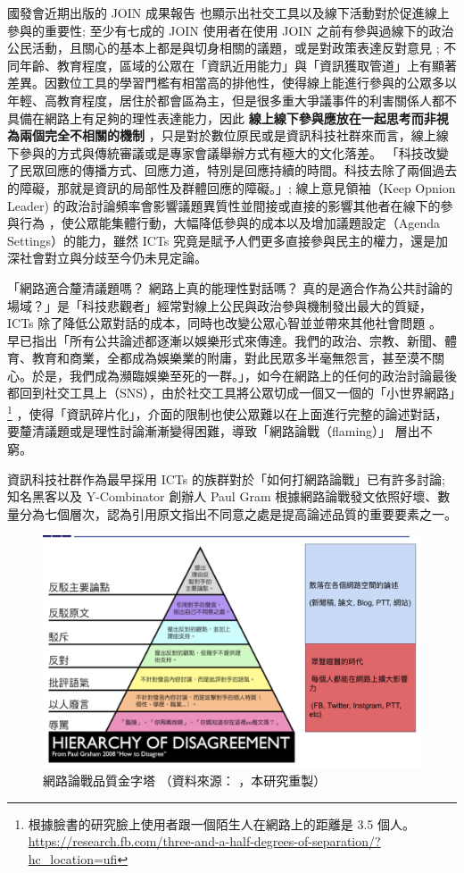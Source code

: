 \documentclass[12pt,a4paper]{article}
\begin{document}
國發會近期出版的 JOIN 成果報告 \citep*{chuang18,lin18a} 也顯示出社交工具以及線下活動對於促進線上參與的重要性; 至少有七成的 JOIN 使用者在使用 JOIN 之前有參與過線下的政治公民活動，且關心的基本上都是與切身相關的議題，或是對政策表達反對意見 ; 不同年齡、教育程度，區域的公眾在「資訊近用能力」與「資訊獲取管道」上有顯著差異。因數位工具的學習門檻有相當高的排他性，使得線上能進行參與的公眾多以年輕、高教育程度，居住於都會區為主，但是很多重大爭議事件的利害關係人都不具備在網路上有足夠的理性表達能力，因此 \textbf{線上線下參與應放在一起思考而非視為兩個完全不相關的機制} ，只是對於數位原民或是資訊科技社群來而言，線上線下參與的方式與傳統審議或是專家會議舉辦方式有極大的文化落差。
 「科技改變了民眾回應的傳播方式、回應力道，特別是回應持續的時間。科技去除了兩個過去的障礙，那就是資訊的局部性及群體回應的障礙。」\citep*[p.141]{xue11_xiang}; 線上意見領袖（Keep Opnion Leader) 的政治討論頻率會影響議題異質性並間接或直接的影響其他者在線下的參與行為 \citep*{lin18b} ，使公眾能集體行動，大幅降低參與的成本以及增加議題設定（Agenda Settings）的能力，雖然 ICTs 究竟是賦予人們更多直接參與民主的權力，還是加深社會對立與分歧至今仍未見定論。

「網路適合釐清議題嗎？ 網路上真的能理性對話嗎？ 真的是適合作為公共討論的場域？」是「科技悲觀者」經常對線上公民與政治參與機制發出最大的質疑，ICTs 除了降低公眾對話的成本，同時也改變公眾心智並並帶來其他社會問題 \citep*{stev11} 。 \citep*{neil16} 早已指出「所有公共論述都逐漸以娛樂形式來傳達。我們的政治、宗教、新聞、體育、教育和商業，全都成為娛樂業的附庸，對此民眾多半毫無怨言，甚至漠不關心。於是，我們成為瀕臨娛樂至死的一群。」，如今在網路上的任何的政治討論最後都回到社交工具上（SNS），由於社交工具將公眾切成一個又一個的「小世界網路」\footnote{根據臉書的研究臉上使用者跟一個陌生人在網路上的距離是 3.5 個人。 \url{https://research.fb.com/three-and-a-half-degrees-of-separation/?hc\_location=ufi}} ，使得「資訊碎片化」，介面的限制也使公眾難以在上面進行完整的論述對話，要釐清議題或是理性討論漸漸變得困難，導致「網路論戰（flaming）」\citep*{wiki:flaming} 層出不窮。

資訊科技社群作為最早採用 ICTs 的族群對於「如何打網路論戰」已有許多討論; 知名黑客以及 Y-Combinator 創辦人 Paul Gram 根據網路論戰發文依照好壞、數量分為七個層次，認為引用原文指出不同意之處是提高論述品質的重要要素之一。\citep*{paul08}

\begin{figure}[htbp]
\centering
\includegraphics[width=.9\linewidth]{./images/how-to-disagree.png}
\caption{\label{fig:org02c2469}
網路論戰品質金字塔 （資料來源： \citep{zhu_2015} ，本研究重製）}
\end{figure}
\end{document}
